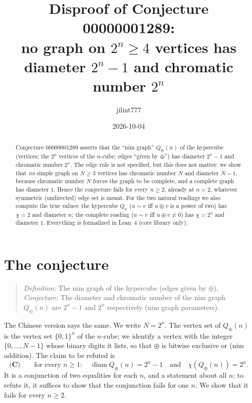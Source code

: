 \documentclass[11pt]{article}
\title{Disproof of Conjecture 00000001289:\\
no graph on $2^n\ge 4$ vertices has diameter $2^n-1$ and chromatic number $2^n$}
\author{jilint777}
\date{2026-10-04}
\theoremstyle{definition}
\theoremstyle{remark}
\begin{document}
\sloppy
\maketitle

\begin{abstract}
Conjecture 00000001289 asserts that the ``nim graph'' $Q_\oplus(n)$ of the
hypercube (vertices: the $2^n$ vertices of the $n$-cube; edges ``given by
$\oplus$'') has diameter $2^n-1$ and chromatic number $2^n$. The edge rule is
not specified, but this does not matter: we show that \emph{no} simple graph on
$N\ge 3$ vertices has chromatic number $N$ and diameter $N-1$, because
chromatic number $N$ forces the graph to be complete, and a complete graph has
diameter $1$. Hence the conjecture fails for every $n\ge2$, already at $n=2$,
whatever symmetric (undirected) edge set is meant. For the two natural readings we also compute
the true values: the hypercube $Q_n$ ($u\sim v$ iff $u\oplus v$ is a power of
two) has $\chi=2$ and diameter $n$; the complete reading ($u\sim v$ iff
$u\oplus v\ne0$) has $\chi=2^n$ and diameter $1$. Everything is formalized in
Lean~4 (core library only).
\end{abstract}

\section{The conjecture}
\begin{quote}
\emph{Definition:} The nim graph of the hypercube (edges given by $\oplus$).
\emph{Conjecture:} The diameter and chromatic number of the nim graph
$Q_\oplus(n)$ are $2^n-1$ and $2^n$ respectively (nim graph parameters).
\end{quote}
The Chinese version says the same. We write $N=2^n$. The vertex set of
$Q_\oplus(n)$ is the vertex set $\{0,1\}^n$ of the $n$-cube; we identify a
vertex with the integer $\{0,\dots,N-1\}$ whose binary digits it lists, so that
$\oplus$ is bitwise exclusive or (nim addition). The claim to be refuted is
\[
\textbf{(C)}\qquad \text{for every } n\ge1:\quad
\operatorname{diam}Q_\oplus(n)=2^n-1 \quad\text{and}\quad \chi(Q_\oplus(n))=2^n .
\]
It is a conjunction of two equalities for each $n$, and a statement about all
$n$; to refute it, it suffices to show that the conjunction fails for one $n$.
We show that it fails for every $n\ge2$.
\end{document}
